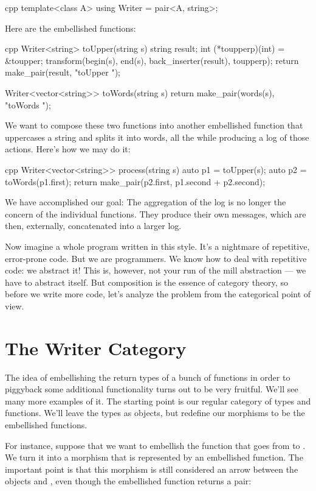 \begin{snip}{cpp}
template<class A>
using Writer = pair<A, string>;
\end{snip}
Here are the embellished functions:

\begin{snip}{cpp}
Writer<string> toUpper(string s) {
    string result;
    int (*toupperp)(int) = &toupper;
    transform(begin(s), end(s), back_inserter(result), toupperp);
    return make_pair(result, "toUpper ");
}

Writer<vector<string>> toWords(string s) {
    return make_pair(words(s), "toWords ");
}
\end{snip}
We want to compose these two functions into another embellished function
that uppercases a string and splits it into words, all the while
producing a log of those actions. Here's how we may do it:

\begin{snip}{cpp}
Writer<vector<string>> process(string s) {
    auto p1 = toUpper(s);
    auto p2 = toWords(p1.first);
    return make_pair(p2.first, p1.second + p2.second);
}
\end{snip}
We have accomplished our goal: The aggregation of the log is no longer
the concern of the individual functions. They produce their own
messages, which are then, externally, concatenated into a larger log.

Now imagine a whole program written in this style. It's a nightmare of
repetitive, error-prone code. But we are programmers. We know how to
deal with repetitive code: we abstract it! This is, however, not your
run of the mill abstraction --- we have to abstract  itself. But composition is the essence of category theory,
so before we write more code, let's analyze the problem from the
categorical point of view.

\section{The Writer Category}

The idea of embellishing the return types of a bunch of functions in
order to piggyback some additional functionality turns out to be very
fruitful. We'll see many more examples of it. The starting point is our
regular category of types and functions. We'll leave the types as
objects, but redefine our morphisms to be the embellished functions.

For instance, suppose that we want to embellish the function
 that goes from  to . We turn it
into a morphism that is represented by an embellished function. The
important point is that this morphism is still considered an arrow
between the objects  and , even though the
embellished function returns a pair:


